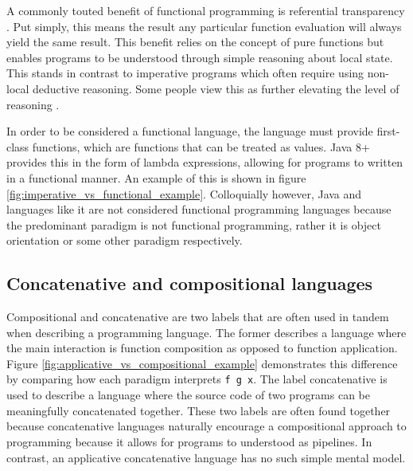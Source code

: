 A commonly touted benefit of functional programming is referential transparency \cite{FunctionalProgrammingHaskellWiki2019} \cite{thompson2011haskell}. Put simply, this means the result any particular function evaluation will always yield the same result. This benefit relies on the concept of pure functions but enables programs to be understood through simple reasoning about local state. This stands in contrast to imperative programs which often require using non-local deductive reasoning. Some people view this as further elevating the level of reasoning \cite{thompson2011haskell}.


In order to be considered a functional language, the language must provide first-class functions, which are functions that can be treated as values. Java 8+ provides this in the form of lambda expressions, allowing for programs to written in a functional manner. An example of this is shown in figure \ref{fig:imperative_vs_functional_example}. Colloquially however, Java and languages like it are not considered functional programming languages because the predominant paradigm is not functional programming, rather it is object orientation or some other paradigm respectively.


\subsection*{Concatenative and compositional languages} 
Compositional and concatenative are two labels that are often used in tandem when describing a programming language. The former describes a language where the main interaction is function composition as opposed to function application. Figure \ref{fig:applicative_vs_compositional_example} demonstrates this difference by comparing how each paradigm interprets \lstinline{f g x}. The label concatenative is used to describe a language where the source code of two programs can be meaningfully concatenated together. These two labels are often found together because concatenative languages naturally encourage a compositional approach to programming because it allows for programs to understood as pipelines. In contrast, an applicative concatenative language has no such simple mental model.




